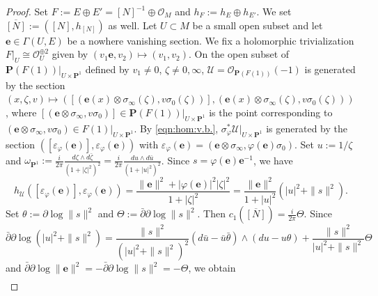 \documentclass[amscd, leqno]{amsart}
\theoremstyle{plain}
\theoremstyle{definition}
\theoremstyle{remark}
\newenvironment{pf}{\begin{proof}}{\end{proof}}
\begin{document}
\begin{pf}
Set $F := E \oplus E' = [N]^{-1} \oplus {\mathcal O}_{M}$ and $h_{F}:=h_{E} \oplus h_{E'}$. We set $\overline{[N]} := ([N], h_{[N]})$ as well.
Let $U \subset M$ be a small open subset and let ${\mathbf e} \in \Gamma(U, E)$ be a nowhere vanishing section.
We fix a holomorphic trivialization $F|_{U} \cong {\mathcal O}_{U}^{\oplus 2}$ given by $(v_{1}{\mathbf e}, v_{2}) \mapsto (v_{1},v_{2})$. 
On the open subset of ${\mathbf P}(F(1))|_{U \times {\mathbf P}^{1}}$ defined by $v_{1}\not=0$, $\zeta\not=0,\infty$,
${\mathscr U} = {\mathcal O}_{{\mathbf P}(F(1))}(-1)$ is generated by the section
$(x, \zeta, v) \mapsto ([({\mathbf e}(x)\otimes\sigma_{\infty}(\zeta), v\sigma_{0}(\zeta))], 
({\mathbf e}(x)\otimes\sigma_{\infty}(\zeta), v\sigma_{0}(\zeta)))$, 
where $[({\mathbf e}\otimes\sigma_{\infty}, v\sigma_{0})] \in {\mathbf P}(F(1))|_{U \times {\mathbf P}^{1}}$ is the point corresponding to 
$({\mathbf e}\otimes\sigma_{\infty}, v\sigma_{0}) \in F(1)|_{U \times {\mathbf P}^{1}}$.
By \eqref{eqn:hom:v.b.}, $\sigma_{\varphi}^{*}{\mathscr U}|_{U\times{\mathbf P}^{1}}$ is generated by the section
$([\varepsilon_{\varphi}({\mathbf e})], \varepsilon_{\varphi}({\mathbf e}))$ with
$\varepsilon_{\varphi}({\mathbf e}) = ( {\mathbf e}\otimes\sigma_{\infty}, \varphi({\mathbf e})\sigma_{0})$. 
Set $u:= 1/\zeta$ and $\omega_{{\mathbf P}^{1}}:=\frac{i}{2\pi} \frac{d\zeta\wedge d\bar{\zeta}}{(1+|\zeta|^{2})^{2}}
= \frac{i}{2\pi} \frac{du \wedge d\bar{u}}{(1+|u|^{2})^{2}}$. 
Since $s = \varphi({\mathbf e}){\mathbf e}^{-1}$, we have 
\begin{equation}
\label{eqn:met:tautlog.l.b}
h_{\mathscr U}( [\varepsilon_{\varphi}({\mathbf e})] , \varepsilon_{\varphi}({\mathbf e}) ) 
= 
\frac{\|{\mathbf e}\|^{2} + |\varphi({\mathbf e})|^{2} |\zeta|^{2}}{1+|\zeta|^{2}}
=
\frac{\| {\mathbf e} \|^{2}}{1+|u|^{2}} ( |u|^{2} + \| s \|^{2} ).
\end{equation}
Set $\theta := \partial \log \|s\|^{2}$ and $\Theta := \bar{\partial}\partial \log \| s \|^{2}$. Then $c_{1}(\overline{[N]})=\frac{i}{2\pi}\Theta$. 
Since
$$
\bar{\partial}\partial \log ( |u|^{2} + \| s \|^{2} ) 
= 
\frac{\| s \|^{2}}{ ( |u|^{2} + \|s\|^{2} )^{2} } (d\bar{u} - \bar{u} \bar{\theta}) {\scriptstyle \wedge} (du - u \theta ) 
+ \frac{\| s \|^{2}}{ |u|^{2} + \| s \|^{2}} \Theta
$$
and $\bar{\partial}\partial \log \| {\mathbf e} \|^{2} = -\bar{\partial}\partial \log \| s \|^{2} = -\Theta$, we obtain
\begin{equation}
\label{eqn:ch:2}
\begin{aligned}

\end{aligned}
\end{equation}
\end{pf}
\end{document}
